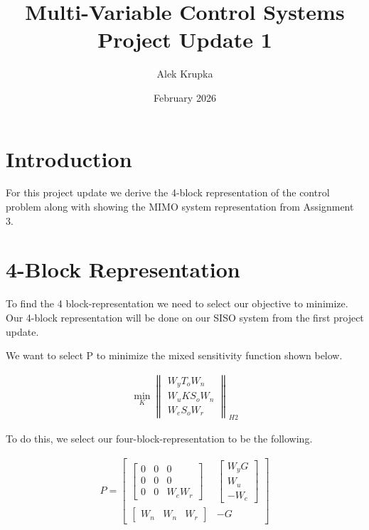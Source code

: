 \documentclass{article}
\title{Multi-Variable Control Systems Project Update 1}
\author{Alek Krupka}
\date{February 2026}
\begin{document}
    \maketitle

    \section{Introduction}\label{sec:introduction}

    For this project update we derive the 4-block representation of the control problem along with showing the MIMO
    system representation from Assignment 3.

    \section{4-Block Representation}\label{sec:four-block-representation}

    To find the 4 block-representation we need to select our objective to minimize.
    Our 4-block representation will be done on our SISO system from the first project update.

    We want to select P to minimize the mixed sensitivity function shown below.

    \begin{align}
        \min_K \left\| \begin{array}{c} W_y T_o  W_n \\ W_u K S_o W_n \\ W_e S_o W_r \end{array} \right\|_{H2}
    \end{align}

    To do this, we select our four-block-representation to be the following.

    \begin{align}
        P = \begin{bmatrix}
                \begin{bmatrix} 0 & 0 & 0 \\ 0 & 0 & 0 \\ 0 & 0 & W_e W_r \end{bmatrix} &
                \begin{bmatrix} W_y G \\ W_u \\ -W_e \end{bmatrix} \\
                \begin{bmatrix} W_n & W_n & W_r \end{bmatrix} & -G
        \end{bmatrix}
    \end{align}
\end{document}
